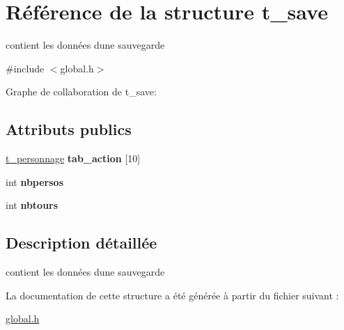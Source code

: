 \hypertarget{a00009}{}\section{Référence de la structure t\+\_\+save}
\label{a00009}


contient les données d\textquotesingle{}une sauvegarde  




{\ttfamily \#include $<$global.\+h$>$}



Graphe de collaboration de t\+\_\+save\+:
\subsection*{Attributs publics}
\begin{DoxyCompactItemize}
\item 
\hyperlink{a00008}{t\+\_\+personnage} {\bfseries tab\+\_\+action} \mbox{[}10\mbox{]}\hypertarget{a00009_a680cbb0935fc627ad4ad6b04d817d8ed}{}\label{a00009_a680cbb0935fc627ad4ad6b04d817d8ed}

\item 
int {\bfseries nbpersos}\hypertarget{a00009_a09cb4efc30f247f058ac7f06cfd68ea6}{}\label{a00009_a09cb4efc30f247f058ac7f06cfd68ea6}

\item 
int {\bfseries nbtours}\hypertarget{a00009_aa7248684bb8d898267db7a53c686300e}{}\label{a00009_aa7248684bb8d898267db7a53c686300e}

\end{DoxyCompactItemize}


\subsection{Description détaillée}
contient les données d\textquotesingle{}une sauvegarde 

La documentation de cette structure a été générée à partir du fichier suivant \+:\begin{DoxyCompactItemize}
\item 
\hyperlink{a00020}{global.\+h}\end{DoxyCompactItemize}

